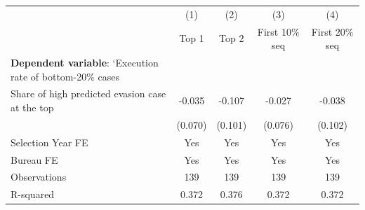{
\def\sym#1{\ifmmode^{#1}\else\(^{#1}\)\fi}
\begin{tabular}{l*{4}{c}}
\toprule
            &\multicolumn{1}{c}{(1)}&\multicolumn{1}{c}{(2)}&\multicolumn{1}{c}{(3)}&\multicolumn{1}{c}{(4)}\\
            &\multicolumn{1}{c}{Top 1}&\multicolumn{1}{c}{Top 2}&\multicolumn{1}{c}{First 10\% seq}&\multicolumn{1}{c}{First 20\% seq}\\
\midrule
\textbf{Dependent variable}: `Execution rate of bottom-20\% cases&                     &                     &                     &                     \\
\addlinespace
Share of high predicted evasion case at the top&      -0.035         &      -0.107         &      -0.027         &      -0.038         \\
            &     (0.070)         &     (0.101)         &     (0.076)         &     (0.102)         \\
\midrule
Selection Year FE&         Yes         &         Yes         &         Yes         &         Yes         \\
Bureau FE   &         Yes         &         Yes         &         Yes         &         Yes         \\
Observations&         139         &         139         &         139         &         139         \\
R-squared   &       0.372         &       0.376         &       0.372         &       0.372         \\
\bottomrule
\end{tabular}
}
